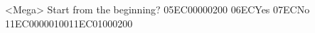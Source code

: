 <Mega> Start from the beginning? {05}{EC}{00}{00}{02}{00}   {06}{EC}Yes   {07}{EC}No 
{11}{EC}{00}{00}{01}{00}{11}{EC}{01}{00}{02}{00}
